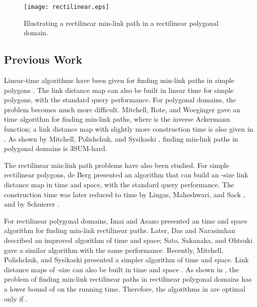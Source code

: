 \documentclass[english,runningheads,11pt]{llncs-revised}
\begin{document}
\begin{figure}[t]
\begin{minipage}[t]{\linewidth}
\begin{center}
\texttt{[image: rectilinear.eps]}
\caption{\footnotesize Illustrating a rectilinear min-link path in
a rectilinear polygonal domain.}
\label{fig:rectilinear}
\end{center}
\end{minipage}
\vspace*{-0.15in}
\end{figure}


\subsection{Previous Work}

Linear-time algorithms have been given for finding min-link paths in simple polygons
\cite{ref:GhoshCo91,ref:HershbergerCo94,ref:SuriA86,ref:SuriMi87,ref:SuriOn90}.
The link distance map can also be built in
linear time \cite{ref:SuriA86,ref:SuriMi87,ref:SuriOn90} for simple
polygons, with the standard query performance.
For polygonal domains, the problem becomes much more
difficult.
Mitchell, Rote, and Woeginger \cite{ref:MitchellMi92}
gave an  time
algorithm for finding min-link paths, where 
is the inverse Ackermann function; a link distance map with slightly more
construction time is also given in \cite{ref:MitchellMi92}.
As shown by Mitchell, Polishchuk, and Sysikaski
\cite{ref:MitchellMi14}, finding
min-link paths in polygonal domains is 3SUM-hard.


The rectilinear min-link path problems have also been studied.
For simple rectilinear polygons, de Berg \cite{ref:deBergOn91}
presented an algorithm that can build an -size
link distance map in  time and  space, with the standard query
performance. The construction time was later reduced
to  time by Lingas, Maheshwari, and Sack
\cite{ref:LingasOp95}, and by Schuierer \cite{ref:SchuiererAn96}.

For rectilinear polygonal domains, Imai and
Asano \cite{ref:ImaiEf86} presented an   time and space
algorithm for finding min-link rectilinear paths.
Later, Das and Narasimhan \cite{ref:DasGe91} described an
improved algorithm of  time and  space; Sato,
Sakanaka, and Ohtsuki \cite{ref:SatoA87} gave a similar algorithm with the same
performance.
Recently, Mitchell, Polishchuk, and Sysikaski \cite{ref:MitchellMi14}
presented a simpler algorithm of  time and  space.
Link distance maps of -size can also be built in 
time and  space \cite{ref:DasGe91,ref:MitchellMi14}.
As shown in \cite{ref:DasGe91,ref:MaheshwariLi00}, the problem of finding min-link
rectilinear paths in rectilinear polygonal domains has a lower bound
of  on the running time. Therefore, the algorithms in
\cite{ref:DasGe91,ref:MitchellMi14,ref:SatoA87} are optimal only if
.
\end{document}

